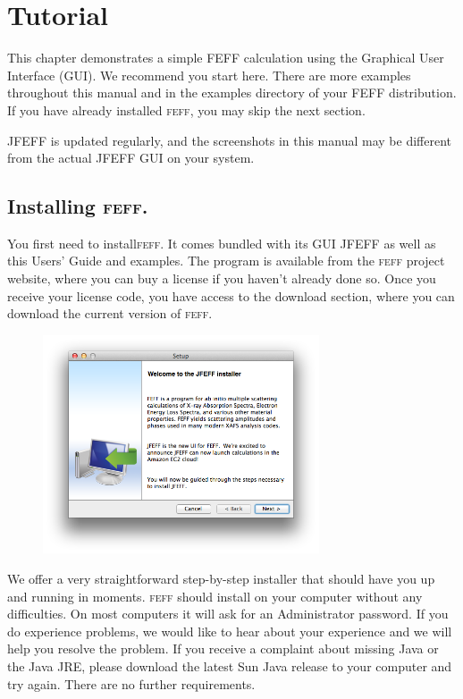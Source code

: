 \documentclass[11pt,oneside]{report} %
\renewcommand{\htmlref}[2]{\hyperlink{#2}{#1}}
\newcommand{\program}[1]{\textsc{#1}}
\newcommand{\feff}{\program{feff}}
\renewcommand{\htmlref}[2]{{#1}} %
\begin{document}
\chapter{Tutorial}
\label{sec:tutorial}


This chapter demonstrates a simple FEFF calculation using the Graphical User Interface (GUI).  We recommend you start here.
There are more examples throughout this manual and in the examples directory of your FEFF distribution.  If you have already installed {\feff}, you may skip the next section.

JFEFF is updated regularly, and the screenshots in this manual may be  different from the actual JFEFF GUI on your system.

\section{Installing {\feff}.}
You first need to install{\feff}.  It comes bundled with its GUI JFEFF as well as this Users' Guide and examples.  The program is available from \htmlref{the {\feff} project website}{http://www.feffgroup.org}, where you can buy a license if you haven't already done so.  Once you receive your license code, you have access to the download section, where you can download the current version of {\feff}.

\begin{figure}[H]
	\centering
		\includegraphics[height=2.548in]{install1.png}
	\label{fig:install1}
\end{figure}

We offer a very straightforward step-by-step installer that should have you up and running in moments.  {\feff} should install on your computer without any difficulties.  On most computers it will ask for an Administrator password.  If you do experience problems, we would like to hear about your experience and we will help you resolve the problem.  If you receive a complaint about missing Java or the Java JRE, please download the latest Sun Java release to your computer and try again.  There are no further requirements.
\end{document}
